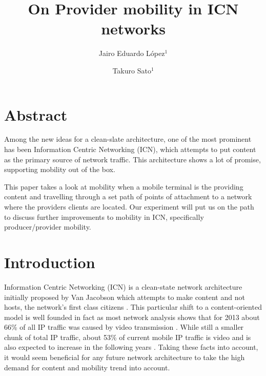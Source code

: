 \documentclass[twocolumn, a4paper]{ieicejsp}
\title{{\bf On Provider mobility in ICN networks}}
\author{
    Jairo Eduardo L\'{o}pez$^1$ \\ \and
    Takuro Sato$^1$ 
}
\begin{document}
\maketitle

\section{Abstract}

Among the new ideas for a clean-slate architecture, one of the most
prominent has been Information Centric Networking (ICN), which attempts to put
content as the primary source of network traffic. This architecture 
shows a lot of promise, 
supporting mobility out of the box. 

This paper takes a look at mobility when a mobile terminal is 
the providing content and travelling through a set path of points of
attachment to a network where the providers clients are located. Our experiment
will put us on the path to discuss further improvements to mobility in ICN, 
specifically producer/provider mobility. 

\section{Introduction}
Information Centric Networking (ICN) is a clean-state network architecture
initially proposed by Van Jacobson which attempts to make content and not
hosts, the network's first class citizens
 \cite{Jacobson:2009:NNC:1658939.1658941}. This particular shift to a
content-oriented model is well founded in fact as most network analysis shows
that for 2013 about 66\% of all IP traffic was caused by video transmission
\cite{cisco:2014:Online}.
While still a smaller chunk of total IP traffic, about 53\% of current mobile
IP traffic is video and is also expected to increase in the following years
\cite{ciscomobile:2014:Online}. Taking these facts into account, it would seem
beneficial for any future network architecture to take the high demand for
content and mobility trend into account.
\end{document}
